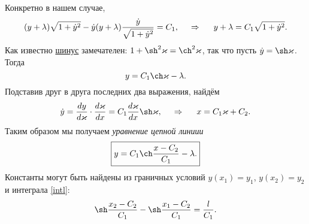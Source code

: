 Конкретно в нашем случае,
\begin{equation*}
    (y+\lambda) \sqrt{1 + \dot{y}^2}
    - \dot{y} (y + \lambda) \frac{\dot{y}}{\sqrt{1+\dot{y}^2}}  = C_1,
    \hspace{0.5cm} \Rightarrow \hspace{0.5cm} 
    y + \lambda = C_1 \sqrt{1 + \dot{y}^2}.
\end{equation*}
Как известно 
\href{https://ru.wikipedia.org/wiki/%D0%A8%D0%B8%D0%BD%D1%83%D1%81}{шинус} замечателен: $1 + \sh^2 \varkappa = \ch^2 \varkappa$, так что пусть $\dot{y} = \sh \varkappa$. Тогда
\begin{equation*}
    y = C_1 \ch \varkappa - \lambda.
\end{equation*}
Подставив друг в друга последних два выражения, найдём
\begin{equation*}
    \dot{y} = \frac{d y}{d \varkappa} \cdot \frac{d \varkappa}{d x} 
    = C_1 \frac{d \varkappa}{d x} 
    \sh \varkappa,
    \hspace{0.5cm} \Rightarrow \hspace{0.5cm} 
    x  = C_1 \varkappa + C_2.
\end{equation*}
Таким образом мы получаем \textit{уравнение цепной линиии}
\begin{equation}
    \boxed{
        y = C_1 \ch \frac{x-C_2}{C_1} - \lambda.
    }
\end{equation}
Константы могут быть найдены из граничных условий $y(x_1)=y_1$, $y(x_2)=y_2$
и интеграла \eqref{intl}:
\begin{equation*}
     \sh \frac{x_2 - C_2}{C_1} - \sh \frac{x_1 - C_2}{C_1} = \frac{l}{C_1}.
\end{equation*} 


